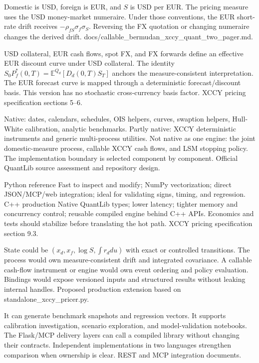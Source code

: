 {Domestic is USD, foreign is EUR, and $S$ is USD per EUR.}
{The pricing measure uses the USD money-market numeraire.}
{Under those conventions, the EUR short-rate drift receives $-\rho_{fS}\sigma_f\sigma_S$.}
{Reversing the FX quotation or changing numeraire changes the derived drift.}
{docs/callable\_bermudan\_xccy\_quant\_two\_pager.md.}

{USD collateral, EUR cash flows, spot FX, and FX forwards define an effective EUR discount curve under USD collateral.}
{The identity $S_0P_f^*(0,T)=\mathbb E^{Q_d}[D_d(0,T)S_T]$ anchors the measure-consistent interpretation.}
{The EUR forecast curve is mapped through a deterministic forecast/discount basis.}
{This version has no stochastic cross-currency basis factor.}
{XCCY pricing specification sections 5--6.}

{Native: dates, calendars, schedules, OIS helpers, curves, swaption helpers, Hull-White calibration, analytic benchmarks.}
{Partly native: XCCY deterministic instruments and generic multi-process utilities.}
{Not native as one engine: the joint domestic-measure process, callable XCCY cash flows, and LSM stopping policy.}
{The implementation boundary is selected component by component.}
{Official QuantLib source assessment and repository design.}

{Python reference}
{Fast to inspect and modify; NumPy vectorization; direct JSON/MCP/web integration; ideal for validating signs, timing, and regression.}
{C++ production}
{Native QuantLib types; lower latency; tighter memory and concurrency control; reusable compiled engine behind C++ APIs.}
{Economics and tests should stabilize before translating the hot path.}
{XCCY pricing specification section 9.3.}

{State could be $(x_d,x_f,\log S,\int r_ddu)$ with exact or controlled transitions.}
{The process would own measure-consistent drift and integrated covariance.}
{A callable cash-flow instrument or engine would own event ordering and policy evaluation.}
{Bindings would expose versioned inputs and structured results without leaking internal handles.}
{Proposed production extension based on standalone\_xccy\_pricer.py.}

{It can generate benchmark snapshots and regression vectors.}
{It supports calibration investigation, scenario exploration, and model-validation notebooks.}
{The Flask/MCP delivery layers can call a compiled library without changing their contracts.}
{Independent implementations in two languages strengthen comparison when ownership is clear.}
{REST and MCP integration documents.}


